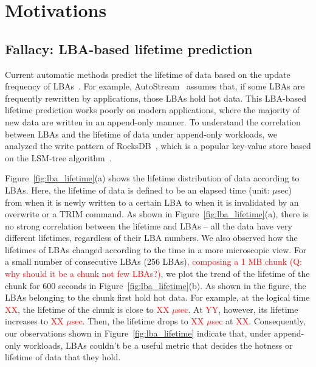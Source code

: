 \section{Motivations}
\subsection{Fallacy: LBA-based lifetime prediction}

Current automatic methods predict the lifetime of data based on the update
frequency of LBAs~\cite{}.  For example, AutoStream~\cite{} assumes that, if
some LBAs are frequently rewritten by applications, those LBAs hold hot data.
This LBA-based lifetime prediction works poorly on modern applications, where
the majority of new data are written in an append-only manner.  To understand
the correlation between LBAs and the lifetime of data under append-only
workloads, we analyzed the write pattern of RocksDB~\cite{}, which is a
popular key-value store based on the LSM-tree algorithm~\cite{}.

Figure~\ref{fig:lba_lifetime}(a) shows the lifetime distribution of data
according to LBAs. Here, the lifetime of data is defined to be an elapsed time
(unit: $\mu$sec) from when it is newly written to a certain LBA to when it is
invalidated by an overwrite or a TRIM command. As shown in
Figure~\ref{fig:lba_lifetime}(a), there is no strong correlation between the
lifetime and LBAs -- all the data have very different lifetimes, regardless of
their LBA numbers. We also observed how the lifetimes of LBAs changed according
to the time in a more microscopic view.  For a small number of consecutive LBAs
(256 LBAs)\textcolor{red}{, composing a 1 MB chunk (Q: why should it be a chunk
not few LBAs?)}, we plot the trend of the lifetime of the chunk for 600 seconds
in Figure~\ref{fig:lba_lifetime}(b). As shown in the figure, the LBAs belonging
to the chunk first hold hot data. For example, at the logical time
\textcolor{red}{XX}, the lifetime of the chunk is close to \textcolor{red}{XX
$\mu$sec}.  At \textcolor{red}{YY}, however, its lifetime increases to
\textcolor{red}{XX $\mu$sec}. Then, the lifetime drops to \textcolor{red}{XX
$\mu$sec} at \textcolor{red}{XX}.  Consequently, our observations shown in
Figure~\ref{fig:lba_lifetime} indicate that, under append-only
workloads, LBAs couldn't be a useful metric that decides the hotness or
lifetime of data that they hold.

